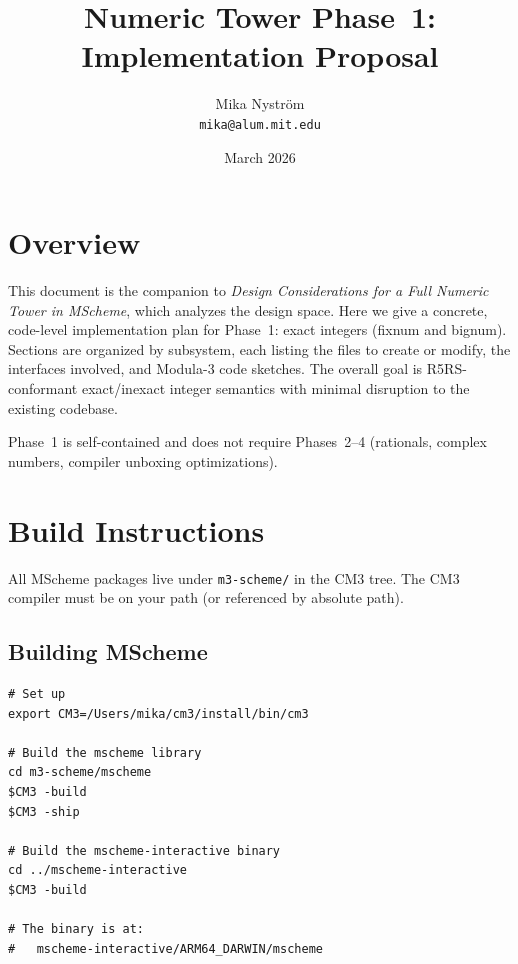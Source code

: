 \documentclass[12pt]{article}
\title{\bfseries\sffamily\fontsize{24.88}{30}\selectfont
  Numeric Tower Phase~1:\\Implementation Proposal}
\author{Mika Nystr\"om \\ {\tt mika@alum.mit.edu}}
\date{March 2026}
\begin{document}
\maketitle
\thispagestyle{empty}

\newpage
\tableofcontents
\newpage

\section{Overview}
\label{sec:overview}

This document is the companion to \emph{Design Considerations for a
Full Numeric Tower in MScheme}, which analyzes the design space.
Here we give a concrete, code-level implementation plan for Phase~1:
exact integers (fixnum and bignum).  Sections are organized by
subsystem, each listing the files to create or modify, the
interfaces involved, and Modula-3 code sketches.  The overall goal
is R5RS-conformant exact/inexact integer semantics with minimal
disruption to the existing codebase.

Phase~1 is self-contained and does not require Phases~2--4
(rationals, complex numbers, compiler unboxing optimizations).

\section{Build Instructions}
\label{sec:build}

All MScheme packages live under {\tt m3-scheme/} in the CM3 tree.
The CM3 compiler must be on your path (or referenced by absolute
path).

\subsection{Building MScheme}

\begin{lstlisting}[language={}]
# Set up
export CM3=/Users/mika/cm3/install/bin/cm3

# Build the mscheme library
cd m3-scheme/mscheme
$CM3 -build
$CM3 -ship

# Build the mscheme-interactive binary
cd ../mscheme-interactive
$CM3 -build

# The binary is at:
#   mscheme-interactive/ARM64_DARWIN/mscheme
\end{lstlisting}
\end{document}
